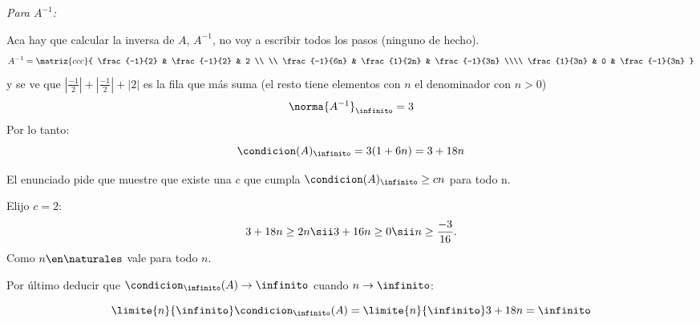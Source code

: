 \begin{enumerate}[label=\red{\angry$_{(\arabic*)}$}]
        \textit{Para $A^{-1}$:}

        Aca hay que calcular la inversa de $A$, $A^{-1}$, no voy a escribir todos los pasos (ninguno de hecho).
        $$
          \everymath{\displaystyle}
          A^{-1} =
          \matriz{ccc}{
            \frac{-1}{2} & \frac{-1}{2} & 2 \\ \\
            \frac{-1}{6n} & \frac{1}{2n} & \frac{-1}{3n} \\\\
            \frac{1}{3n} & 0 & \frac{-1}{3n}
          }
        $$
        y se ve que $|\frac{-1}{2}| + |\frac{-1}{2}| + |2|$ es la fila que más suma
        (el resto tiene elementos con $n$ el denominador con $n > 0$)
        $$
          \norma{A^{-1}}_\infinito = 3
        $$
        Por lo tanto:
        $$
          \condicion(A)_\infinito = 3(1 + 6n) = 3 + 18n
        $$

        El enunciado pide que muestre que existe una $c$ que cumpla $\condicion(A)_\infinito \geq cn$ para todo n.

        Elijo $c = 2$:
        $$
          3 + 18n \geq 2n \sii 3 + 16n \geq 0 \sii n \geq \frac{-3}{16}.
        $$
        Como $n \en \naturales$ vale para todo $n$.

        Por último deducir que $\condicion_\infinito(A) \to \infinito$ cuando $n \to \infinito$:

        $$
          \limite{n}{\infinito}\condicion_\infinito(A) = \limite{n}{\infinito} 3+18n = \infinito
        $$
\end{enumerate}

\begin{aportes}
  \item {}
  \item {}
\end{aportes}
